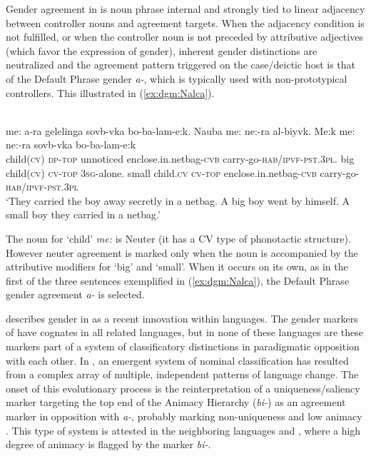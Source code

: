 \documentclass[output=collectionpaper]{langsci/langscibook}
\begin{document}
Gender agreement in  is noun phrase internal and strongly tied to linear adjacency between controller nouns and agreement targets. When the adjacency condition is not fulfilled, or when the controller noun is not preceded by attributive adjectives (which favor the expression of gender), inherent gender distinctions are neutralized and the agreement pattern triggered on the case/deictic host is that of the Default Phrase gender \textit{a-}, which is typically used with non-prototypical controllers. This illustrated in (\ref{ex:dgm:Nalca}).

\newpage 
\ea\label{ex:dgm:Nalca}
\\
\gll me: a-ra gelelinga sovb-vka bo-ba-lam-e:k. Nauba me: ne:-ra al-biyvk. Me:k me: ne:-ra sovb-vka bo-ba-lam-e:k\\
child(\textsc{cv}) \textsc{dp-top} unnoticed enclose.in.netbag-\textsc{cvb} carry-go-\textsc{hab/ipvf-pst.3pl}. big child(\textsc{cv}) \textsc{cv-top} \textsc{3sg-}alone. small child.\textsc{cv} \textsc{cv-top} enclose.in.netbag-\textsc{cvb} carry-go-\textsc{hab/ipvf-pst.3pl}\\
\glt `They carried the boy away secretly in a netbag. A big boy went by himself. A small boy they carried in a netbag.'\\
\z

The  noun for `child' \textit{me:} is Neuter (it has a CV type of phonotactic structure). However neuter agreement is marked only when the noun is accompanied by the attributive modifiers for `big' and `small'. When it occurs on its own, as in the first of the three sentences exemplified in (\ref{ex:dgm:Nalca}),  the Default Phrase gender agreement \textit{a-} is selected.


\citet{Waelchli2018} describes gender in  as a recent innovation within  languages. The gender markers of  have cognates in all related  languages, but in none of these languages are these markers part of a system of classificatory distinctions in paradigmatic opposition with each other. In , an emergent system of nominal classification has resulted from a complex array of multiple, independent patterns of language change. The onset of this evolutionary process is the reinterpretation of a uniqueness/saliency marker targeting the top end of the Animacy Hierarchy (\textit{bi-}) as an agreement marker in opposition with \textit{a-}, probably marking non-uniqueness and low animacy \citep{Waelchli2018}. This type of system is attested in the neighboring languages  and , where a high degree of animacy is flagged by the marker \textit{bi-}.
\end{document}
